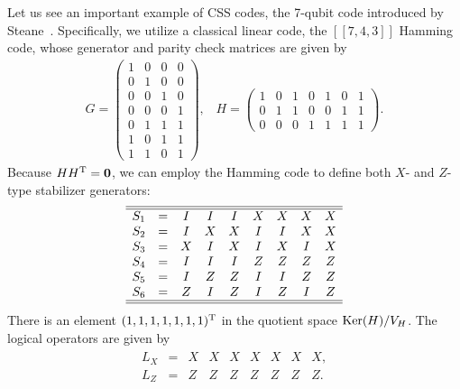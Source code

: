 Let us see an important example of CSS codes, the 7-qubit code introduced by Steane~\cite{Steane96}.
Specifically, we utilize a classical linear code, the $[[7,4,3]]$ Hamming code, whose generator and parity check matrices are given by
\begin{eqnarray}
G= \left( 
\begin{array}{cccc}
1 & 0 & 0& 0
\\
0 & 1 & 0 & 0
\\
0 & 0& 1 & 0
\\
0 & 0& 0& 1
\\
0 & 1 & 1 & 1 
\\
1 & 0 & 1 & 1 
\\
1 & 1 & 0 & 1
\end{array}
\right),
\;\;\;
H= \left( 
\begin{array}{ccccccc}
1 & 0 & 1 & 0 & 1 & 0 & 1
\\
0 & 1 & 1 & 0 & 0 & 1 & 1
\\
0 & 0 & 0 & 1 & 1 & 1 & 1
\end{array}
\right).
\end{eqnarray}
Because $H H^{\rm T}=\mathbf{0}$, we can employ the Hamming code to define both $X$- and $Z$-type stabilizer generators:
%
\begin{equation}
\begin{array}{cccccccccc}
\hline \hline
S_{1}&=& I&I&I&X&X&X&X
\\
S_{2}&=& I&X&X&I&I&X&X
\\
S_{3}&=& X&I&X&I&X&I&X
\\
S_{4}&=& I&I&I&Z&Z&Z&Z
\\
S_{5}&=& I&Z&Z&I&I&Z&Z
\\
S_{6}&=& Z&I&Z&I&Z&I&Z
\\
\hline
\hline
\end{array}
\end{equation}
There is an element $(1,1,1,1,1,1,1)^{\rm T}$ in the quotient space ${\rm Ker}(H)/V_H$.
The logical operators are given by
\begin{eqnarray}
\begin{array}{cccccccccc}
L_X&=& X&X&X&X&X&X&X,
\\
L_Z&=& Z&Z&Z&Z&Z&Z&Z.
\end{array}
\end{eqnarray}


